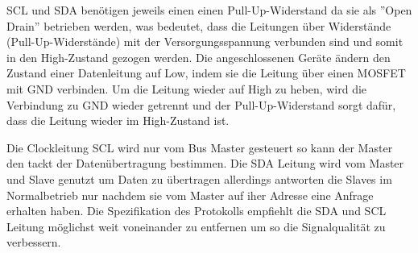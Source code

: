 SCL und SDA benötigen jeweils einen einen Pull-Up-Widerstand da sie als ”Open Drain” betrieben werden, was bedeutet, dass die Leitungen über Widerstände (Pull-Up-Widerstände) mit der Versorgungsspannung verbunden sind und somit in den High-Zustand gezogen werden.
Die angeschlossenen Geräte ändern den Zustand einer Datenleitung auf Low, indem sie die Leitung über einen MOSFET mit GND verbinden.
Um die Leitung wieder auf High zu heben, wird die Verbindung zu GND wieder getrennt und der Pull-Up-Widerstand sorgt dafür, dass die Leitung wieder im High-Zustand ist. 

Die Clockleitung SCL wird nur vom Bus Master gesteuert so kann der Master den tackt der Datenübertragung bestimmen.
Die SDA Leitung wird vom Master und Slave genutzt um Daten zu übertragen allerdings antworten die Slaves im Normalbetrieb nur nachdem sie vom Master auf iher Adresse eine Anfrage erhalten haben. 
Die Spezifikation des Protokolls\cite{nxp_com} empfiehlt die SDA und SCL Leitung möglichst weit voneinander zu entfernen um so die Signalqualität zu verbessern.


